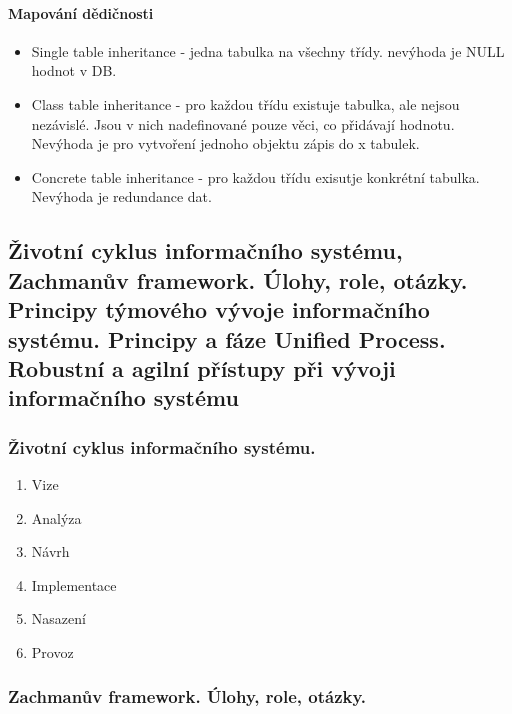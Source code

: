 \documentclass[10pt,a4paper]{article}
\begin{document}
\paragraph{Mapování dědičnosti}
\begin{itemize}
\item Single table inheritance - jedna tabulka na všechny třídy. nevýhoda je NULL hodnot v DB.
\item Class table inheritance - pro každou třídu existuje tabulka, ale nejsou nezávislé. Jsou v nich nadefinované pouze věci, co přidávají hodnotu. Nevýhoda je pro vytvoření jednoho objektu zápis do x tabulek.
\item Concrete table inheritance - pro každou třídu exisutje konkrétní tabulka. Nevýhoda je redundance dat.
\end{itemize}
\subsection{Životní cyklus informačního systému, Zachmanův framework. Úlohy, role, otázky. Principy týmového vývoje informačního systému. Principy a fáze Unified Process. Robustní a agilní přístupy při vývoji informačního systému}
\subsubsection{Životní cyklus informačního systému.}
\begin{enumerate}
\item Vize
\item Analýza
\item Návrh
\item Implementace
\item Nasazení
\item Provoz
\end{enumerate}
\subsubsection{Zachmanův framework. Úlohy, role, otázky.}
\end{document}
